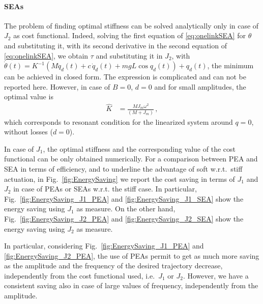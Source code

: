 \paragraph{SEAs} The problem of finding optimal stiffness can be solved analytically only in case of $J_2$ as cost functional. Indeed, solving the first equation of \eqref{eq:onelinkSEA} for $\theta$ and substituting it, with its second derivative in the second equation of \eqref{eq:onelinkSEA}, we obtain $\tau$
and substituting it in $J_2$, with $\dot\theta(t)=K^{-1}(M\ddot q_d(t)+c\,\dot q_d(t)+mgL\cos q_d(t))+q_d(t)$, the minimum can be achieved in closed form. The expression is complicated and can not be reported here. However, in case of $B=0$, $d=0$ and for small amplitudes, the optimal value is
\[
\begin{aligned}
\hat K &= \frac{MJ_m\omega^2}{(M+J_m)}\,,
\end{aligned}
\]
which corresponds to resonant condition for the linearized system around $q=0$, without losses ($d=0$). 

In case of $J_1$, the optimal stiffness and the corresponding value of the cost functional can be only obtained numerically. 
For a comparison between PEA and SEA in terms of efficiency, and to underline the advantage of soft w.r.t.~stiff actuation, in Fig.~\ref{fig:EnergySaving} we report the cost saving in terms of $J_1$ and $J_2$ in case of PEAs or SEAs w.r.t. the stiff case. In particular, Fig.~\ref{fig:EnergySaving_J1_PEA} and \ref{fig:EnergySaving_J1_SEA} show the energy saving using $J_1$ as measure. On the other hand, Fig.~\ref{fig:EnergySaving_J2_PEA} and \ref{fig:EnergySaving_J2_SEA} show the energy saving using $J_2$ as measure.

In particular, considering Fig.~\ref{fig:EnergySaving_J1_PEA} and \ref{fig:EnergySaving_J2_PEA}, the use of PEAs permit to get as much more saving as the amplitude and the frequency of the desired trajectory decrease, independently from the cost functional used, i.e.~$J_1$ or $J_2$. However, we have a consistent saving also in case of large values of frequency, independently from the amplitude. 

